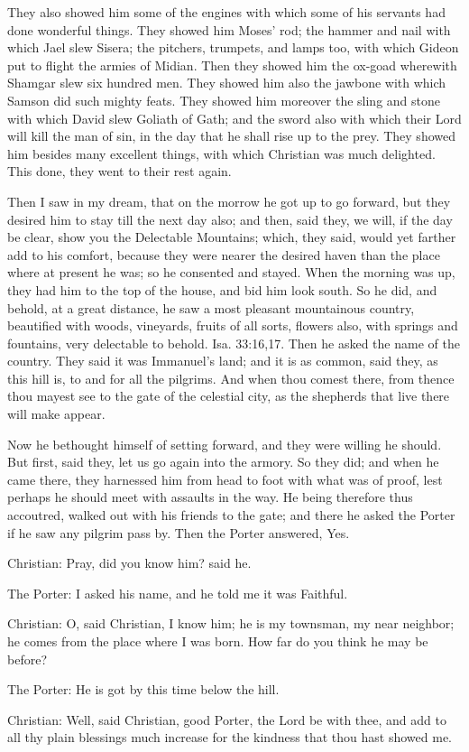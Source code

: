 They also showed him some of the engines with which some of his servants had done wonderful things. They showed him Moses' rod; the hammer and nail with which Jael slew Sisera; the pitchers, trumpets, and lamps too, with which Gideon put to flight the armies of Midian. Then they showed him the ox-goad wherewith Shamgar slew six hundred men. They showed him also the jawbone with which Samson did such mighty feats. They showed him moreover the sling and stone with which David slew Goliath of Gath; and the sword also with which their Lord will kill the man of sin, in the day that he shall rise up to the prey. They showed him besides many excellent things, with which Christian was much delighted. This done, they went to their rest again.

Then I saw in my dream, that on the morrow he got up to go forward, but they desired him to stay till the next day also; and then, said they, we will, if the day be clear, show you the Delectable Mountains; which, they said, would yet farther add to his comfort, because they were nearer the desired haven than the place where at present he was; so he consented and stayed. When the morning was up, they had him to the top of the house, and bid him look south. So he did, and behold, at a great distance, he saw a most pleasant mountainous country, beautified with woods, vineyards, fruits of all sorts, flowers also, with springs and fountains, very delectable to behold. Isa. 33:16,17. Then he asked the name of the country. They said it was Immanuel's land; and it is as common, said they, as this hill is, to and for all the pilgrims. And when thou comest there, from thence thou mayest see to the gate of the celestial city, as the shepherds that live there will make appear.

Now he bethought himself of setting forward, and they were willing he should. But first, said they, let us go again into the armory. So they did; and when he came there, they harnessed him from head to foot with what was of proof, lest perhaps he should meet with assaults in the way. He being therefore thus accoutred, walked out with his friends to the gate; and there he asked the Porter if he saw any pilgrim pass by. Then the Porter answered, Yes.

Christian: Pray, did you know him? said he.

The Porter: I asked his name, and he told me it was Faithful.

Christian: O, said Christian, I know him; he is my townsman, my near neighbor; he comes from the place where I was born. How far do you think he may be before?

The Porter: He is got by this time below the hill.

Christian: Well, said Christian, good Porter, the Lord be with thee, and add to all thy plain blessings much increase for the kindness that thou hast showed me. 
